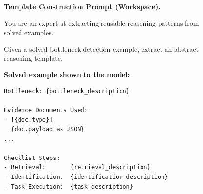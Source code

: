 \begin{figure}[!t]
\centering
\begin{tcolorbox}[colback=gray!5, colframe=gray!50,
                  boxrule=0.5pt, arc=2mm,
                  left=4pt, right=4pt, top=3pt, bottom=3pt]
\small
\textbf{Template Construction Prompt (Workspace).}

You are an expert at extracting reusable reasoning patterns from solved examples.

Given a solved bottleneck detection example, extract an abstract reasoning template.

\medskip
\textbf{Solved example shown to the model:}
\begin{verbatim}
Bottleneck: {bottleneck_description}

Evidence Documents Used:
- [{doc.type}]
  {doc.payload as JSON}
...

Checklist Steps:
- Retrieval:       {retrieval_description}
- Identification:  {identification_description}
- Task Execution:  {task_description}
\end{verbatim}


\end{tcolorbox}
\end{figure}
